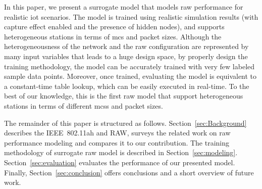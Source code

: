In this paper, we present a surrogate model that models \gls{raw} performance for realistic \gls{iot} scenarios. The model is trained using realistic simulation results (with capture effect enabled and the presence of hidden nodes), and supports heterogeneous stations in terms of \gls{mcs} and packet sizes. Although the heterogeneousness of the network and  the \gls{raw} configuration are represented by many input variables that leads to a huge design space, by properly design the  training methodology, the model can be accurately trained with very few labeled sample data points. Moreover, once trained, evaluating the model is equivalent to a constant-time table lookup, which can be easily executed in real-time. To the best of our knowledge, this is the first \gls{raw} model that support heterogeneous stations in terms of different \gls{mcs}s and packet sizes.


The remainder of this paper is structured as follows. Section~\ref{sec:Background} describes the IEEE~802.11ah and RAW, surveys the related work on \gls{raw} performance modeling and compares it to our contribution.
The training methodology of surrogate \gls{raw} model is described in Section~\ref{sec:modeling}. Section~\ref{sec:evaluation} evaluates the performance of our presented model. Finally, Section~\ref{sec:conclusion} offers conclusions and a short overview of future work.


